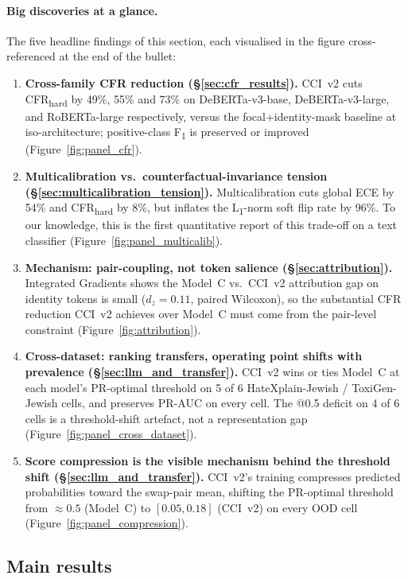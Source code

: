\paragraph{Big discoveries at a glance.}
The five headline findings of this section, each visualised in the figure cross-referenced at the end of the bullet:
\begin{enumerate}[leftmargin=*,itemsep=2pt]
    \item \textbf{Cross-family CFR reduction (\S\ref{sec:cfr_results}).} CCI~v2 cuts CFR\textsubscript{hard} by 49\%, 55\% and 73\% on DeBERTa-v3-base, DeBERTa-v3-large, and RoBERTa-large respectively, versus the focal+identity-mask baseline at iso-architecture; positive-class F\textsubscript{1} is preserved or improved (Figure~\ref{fig:panel_cfr}).
    \item \textbf{Multicalibration vs.\ counterfactual-invariance tension (\S\ref{sec:multicalibration_tension}).} Multicalibration cuts global ECE by 54\% and CFR\textsubscript{hard} by 8\%, but inflates the L\textsubscript{1}-norm soft flip rate by 96\%. To our knowledge, this is the first quantitative report of this trade-off on a text classifier (Figure~\ref{fig:panel_multicalib}).
    \item \textbf{Mechanism: pair-coupling, not token salience (\S\ref{sec:attribution}).} Integrated Gradients shows the Model~C vs.\ CCI~v2 attribution gap on identity tokens is small ($d_z = 0.11$, paired Wilcoxon), so the substantial CFR reduction CCI~v2 achieves over Model~C must come from the pair-level constraint (Figure~\ref{fig:attribution}).
    \item \textbf{Cross-dataset: ranking transfers, operating point shifts with prevalence (\S\ref{sec:llm_and_transfer}).} CCI~v2 wins or ties Model~C at each model's PR-optimal threshold on 5 of 6 HateXplain-Jewish / ToxiGen-Jewish cells, and preserves PR-AUC on every cell. The @0.5 deficit on 4 of 6 cells is a threshold-shift artefact, not a representation gap (Figure~\ref{fig:panel_cross_dataset}).
    \item \textbf{Score compression is the visible mechanism behind the threshold shift (\S\ref{sec:llm_and_transfer}).} CCI~v2's training compresses predicted probabilities toward the swap-pair mean, shifting the PR-optimal threshold from $\approx 0.5$ (Model~C) to $[0.05, 0.18]$ (CCI~v2) on every OOD cell (Figure~\ref{fig:panel_compression}).
\end{enumerate}

\subsection{Main results}
\label{sec:main_results}

